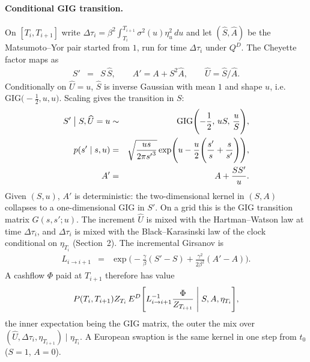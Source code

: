 \documentclass[12pt,a4paper,final]{article}
\theoremstyle{plain}
\begin{document}
\paragraph{Conditional GIG transition.}
On $[T_i,T_{i+1}]$ write $\Delta\tau_i=\beta^{2}\int_{T_i}^{T_{i+1}}
\sigma^{2}(u)\eta_u^{2}\,du$ and let $(\widehat S,\widehat A)$ be the
Matsumoto--Yor pair started from $1$, run for time $\Delta\tau_i$ under
$Q^{D}$. The Cheyette factor maps as
\begin{eqnarray*}
S'&=&S\,\widehat S,\qquad
A'=A+S^{2}\widehat A,\qquad
\widehat U=\widehat S/\widehat A.
\end{eqnarray*}
Conditionally on $\widehat U=u$, $\widehat S$ is inverse Gaussian with
mean $1$ and shape $u$, i.e.\
$\mathrm{GIG}\bigl(-\tfrac12,u,u\bigr)$. Scaling gives the transition
in $S$:
\begin{eqnarray*}
S'\bigm|S,\widehat U=u
&\sim&
\mathrm{GIG}\Biggl(-\frac12,\,u S,\,\frac{u}{S}\Biggr),\\
p(s'\mid s,u)
&=&
\sqrt{\frac{u s}{2\pi {s'}^{3}}}
\exp\Biggl(
u-\frac{u}{2}\Biggl(\frac{s'}{s}+\frac{s}{s'}\Biggr)
\Biggr),\\
A'
&=&
A+\frac{S S'}{u}.
\end{eqnarray*}
Given $(S,u)$, $A'$ is deterministic: the two-dimensional kernel in
$(S,A)$ collapses to a one-dimensional GIG in $S'$. On a grid this is
the GIG transition matrix $G(s,s';u)$. The increment $\widehat U$ is
mixed with the Hartman--Watson law at time $\Delta\tau_i$, and
$\Delta\tau_i$ is mixed with the Black--Karasinski law of the clock
conditional on $\eta_{T_i}$ (Section~2). The incremental Girsanov is
\begin{eqnarray*}
L_{i\to i+1}
&=&
\exp\Biggl(
-\frac{\gamma}{\beta}(S'-S)
+\frac{\gamma^{2}}{2\beta^{2}}(A'-A)
\Biggr).
\end{eqnarray*}
A cashflow $\Phi$ paid at $T_{i+1}$ therefore has value
\begin{eqnarray*}
P(T_i,T_{i+1})Z_{T_i}\,
E^{D}\Biggl[
L_{i\to i+1}^{-1}\frac{\Phi}{Z_{T_{i+1}}}
\Biggm|S,A,\eta_{T_i}\Biggr],
\end{eqnarray*}
the inner expectation being the GIG matrix, the outer the mix over
$(\widehat U,\Delta\tau_i,\eta_{T_{i+1}})\mid\eta_{T_i}$. A European
swaption is the same kernel in one step from $t_0$ ($S=1$, $A=0$).
\end{document}

